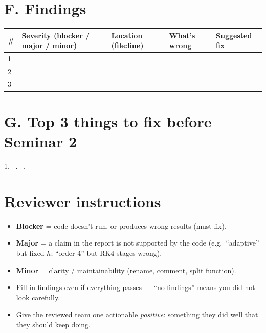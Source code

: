 \documentclass[11pt]{article}
\newcommand{\fillbox}[1][3cm]{\framebox[#1]{\rule{0pt}{2.4ex}\rule{#1}{0pt}}}
\begin{document}
\section*{F. Findings}
\begin{table}[h]
\centering
\small
\begin{tabular}{@{}p{0.8cm}p{3.2cm}p{3.2cm}p{3.2cm}p{3.5cm}@{}}
\toprule
\# & Severity (blocker / major / minor) & Location (file:line) & What's wrong & Suggested fix \\
\midrule
1 & & & & \\
2 & & & & \\
3 & & & & \\
\bottomrule
\end{tabular}
\end{table}

\section*{G. Top 3 things to fix before Seminar 2}
1.\ \fillbox[5cm] .\ \fillbox[5cm] .\ \fillbox[5cm]

\section*{Reviewer instructions}
\begin{itemize}[leftmargin=2em, itemsep=2pt]
  \item \textbf{Blocker} = code doesn't run, or produces wrong results (must fix).
  \item \textbf{Major} = a claim in the report is not supported by the code
    (e.g.\ ``adaptive'' but fixed $h$; ``order 4'' but RK4 stages wrong).
  \item \textbf{Minor} = clarity / maintainability (rename, comment, split function).
  \item Fill in findings even if everything passes --- ``no findings'' means you
    did not look carefully.
  \item Give the reviewed team one actionable \emph{positive}: something they
    did well that they should keep doing.
\end{itemize}
\end{document}
